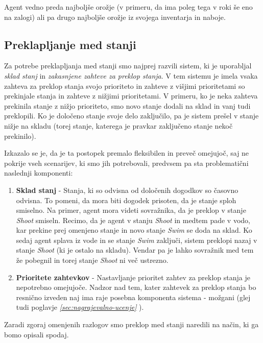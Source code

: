 \documentclass[a4paper,10pt]{article}
\begin{document}
Agent vedno preda najboljše orožje (v primeru, da ima poleg tega v roki še eno na zalogi) ali pa drugo najboljše orožje iz svojega inventarja in naboje.

\subsection{Preklapljanje med stanji}

Za potrebe preklapljanja med stanji smo najprej razvili sistem, ki je uporabljal \textit{sklad stanj} in \textit{zakasnjene zahteve za preklop stanja}. V tem sistemu je imela vsaka zahteva za preklop stanja svojo prioriteto in zahteve z višjimi prioritetami so prekinjale stanja in zahteve z nižjimi prioritetami. V primeru, ko je neka zahteva prekinila stanje z nižjo prioriteto, smo novo stanje dodali na sklad in vanj tudi preklopili. Ko je določeno stanje svoje delo zaključilo, pa je sistem prešel v stanje nižje na skladu (torej stanje, katerega je pravkar zaključeno stanje nekoč prekinilo).

Izkazalo se je, da je ta postopek premalo fleksibilen in preveč omejujoč, saj ne pokrije vseh scenarijev, ki smo jih potrebovali, predvsem pa sta problematični naslednji komponenti:

\begin{enumerate}
 \item \textbf{Sklad stanj} - Stanja, ki so odvisna od določenih dogodkov so časovno odvisna. To pomeni, da mora biti dogodek prisoten, da je stanje sploh smiselno. Na primer, agent mora videti sovražnika, da je preklop v stanje \textit{Shoot} smiseln. Recimo, da je agent v stanju \textit{Shoot} in medtem pade v vodo, kar prekine prej omenjeno stanje in novo stanje \textit{Swim} se doda na sklad. Ko sedaj agent splava iz vode in se stanje \textit{Swim} zaključi, sistem preklopi nazaj v stanje \textit{Shoot} (ki je ostalo na skladu). Vendar pa je lahko sovražnik med tem že pobegnil in torej stanje \textit{Shoot} ni več ustrezno.
  
 \item \textbf{Prioritete zahtevkov} - Nastavljanje prioritet zahtev za preklop stanja je nepotrebno omejujoče. Nadzor nad tem, kater zahtevek za preklop stanja bo resnično izveden naj ima raje posebna komponenta sistema - možgani (glej tudi poglavje \textit{\ref{sec:nagrajevalno-ucenje} }).
\end{enumerate}

Zaradi zgoraj omenjenih razlogov smo preklop med stanji naredili na način, ki ga bomo opisali spodaj.
\end{document}
